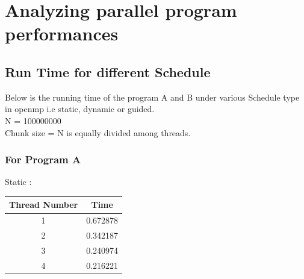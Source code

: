 \documentclass[a4paper,10pt]{article}
\begin{document}
\section{Analyzing parallel program performances}
\subsection{Run Time for different Schedule}
Below is the running time of the program A and B under various Schedule type in openmp i.e static, dynamic or guided.\\
N = 100000000\\
Chunk size = N is equally divided among threads.
\subsubsection{For Program A}
\hspace*{5mm} Static :
\begin{center}

\begin{tabular}{ |c|c| } 
 \hline
Thread Number & Time \\ 
 \hline 
 1 &  0.672878\\
  2 & 0.342187 \\
  3  & 0.240974 \\
  4 & 0.216221\\

 \hline
\end{tabular}
\end{center}
\end{document}

